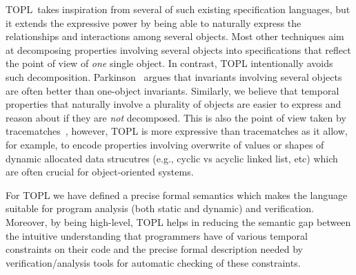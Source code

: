\documentclass{llncs} %
\newcommand{\TPL}{TOPL}
\begin{document}
%
\TPL \ takes inspiration from several of such existing specification languages, but it extends the expressive power by
being able to naturally express  the relationships and interactions among several objects.
Most other techniques aim at decomposing properties involving several objects into specifications that reflect the point of view of {\em one} single object.
In contrast, TOPL intentionally avoids such decomposition.
Parkinson~\cite{parkinson-iwaco2007} argues that invariants involving several objects are often better than one-object invariants. 
Similarly, we believe that temporal properties that naturally involve a plurality of objects are easier to express and reason about if they are \emph{not} decomposed. 
This is also the point of view taken by tracematches~\cite{DBLP:conf/oopsla/AllanACHKLMSST05}, however, TOPL is more expressive than tracematches as it allow, for example, to encode properties involving overwrite of values or shapes of dynamic allocated data strucutres (e.g., cyclic vs acyclic linked list, etc) which are often crucial for object-oriented systems.

For TOPL we have defined a precise formal semantics which makes the language suitable for program analysis (both static and dynamic) and verification. Moreover, by being high-level,  
TOPL helps in  reducing the semantic gap between 
the intuitive understanding that programmers have of various temporal constraints on their code 
and the precise formal description needed by verification/analysis tools for automatic checking of these constraints.
\end{document}
